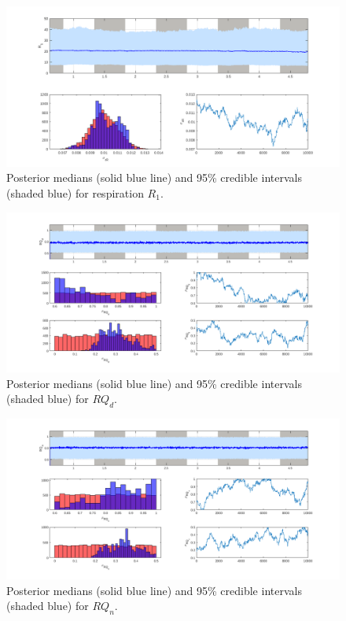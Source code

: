\documentclass{ruthesis}
\begin{document}
\begin{figure}
	\centerline{\includegraphics[width=1.2\textwidth]{images_microalgae/plots_iterative/R}}
	\caption[.]{Posterior medians (solid blue line) and 95\% credible intervals (shaded blue) for respiration $R_1$.}
	\label{fig:micro_exp_iterative_R}
\end{figure}

\begin{figure}
	\centerline{\includegraphics[width=1.2\textwidth]{images_microalgae/plots_iterative/RQ_d}}
	\caption[.]{Posterior medians (solid blue line) and 95\% credible intervals (shaded blue) for $RQ_d$.}
	\label{fig:micro_exp_iterative_RQ_d}
\end{figure}

\begin{figure}
	\centerline{\includegraphics[width=1.2\textwidth]{images_microalgae/plots_iterative/RQ_n}}
	\caption[.]{Posterior medians (solid blue line) and 95\% credible intervals (shaded blue) for $RQ_n$.}
	\label{fig:micro_exp_iterative_RQ_n}
\end{figure}
\end{document}
